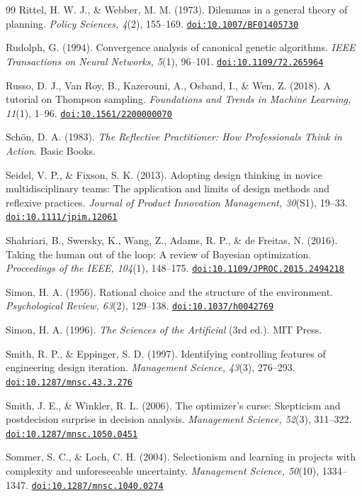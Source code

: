 \documentclass[10pt,twocolumn]{article}
\providecommand{\doi}[1]{\href{https://doi.org/#1}{\nolinkurl{doi:#1}}}
\theoremstyle{definition}
\begin{document}
\begin{thebibliography}{99}
 Rittel, H. W. J., \& Webber, M. M. (1973). Dilemmas in a general theory of planning. \textit{Policy Sciences, 4}(2), 155--169. \doi{10.1007/BF01405730}

 Rudolph, G. (1994). Convergence analysis of canonical genetic algorithms. \textit{IEEE Transactions on Neural Networks, 5}(1), 96--101. \doi{10.1109/72.265964}

 Russo, D. J., Van Roy, B., Kazerouni, A., Osband, I., \& Wen, Z. (2018). A tutorial on Thompson sampling. \textit{Foundations and Trends in Machine Learning, 11}(1), 1--96. \doi{10.1561/2200000070}

 Sch{\"o}n, D. A. (1983). \textit{The Reflective Practitioner: How Professionals Think in Action}. Basic Books.

 Seidel, V. P., \& Fixson, S. K. (2013). Adopting design thinking in novice multidisciplinary teams: The application and limits of design methods and reflexive practices. \textit{Journal of Product Innovation Management, 30}(S1), 19--33. \doi{10.1111/jpim.12061}

 Shahriari, B., Swersky, K., Wang, Z., Adams, R. P., \& de Freitas, N. (2016). Taking the human out of the loop: A review of Bayesian optimization. \textit{Proceedings of the IEEE, 104}(1), 148--175. \doi{10.1109/JPROC.2015.2494218}

 Simon, H. A. (1956). Rational choice and the structure of the environment. \textit{Psychological Review, 63}(2), 129--138. \doi{10.1037/h0042769}

 Simon, H. A. (1996). \textit{The Sciences of the Artificial} (3rd ed.). MIT Press.

 Smith, R. P., \& Eppinger, S. D. (1997). Identifying controlling features of engineering design iteration. \textit{Management Science, 43}(3), 276--293. \doi{10.1287/mnsc.43.3.276}

 Smith, J. E., \& Winkler, R. L. (2006). The optimizer's curse: Skepticism and postdecision surprise in decision analysis. \textit{Management Science, 52}(3), 311--322. \doi{10.1287/mnsc.1050.0451}

 Sommer, S. C., \& Loch, C. H. (2004). Selectionism and learning in projects with complexity and unforeseeable uncertainty. \textit{Management Science, 50}(10), 1334--1347. \doi{10.1287/mnsc.1040.0274}


\end{thebibliography}
\end{document}
